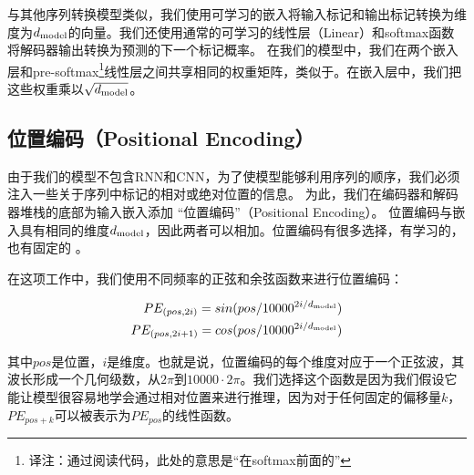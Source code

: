 与其他序列转换模型类似，我们使用可学习的嵌入将输入标记和输出标记转换为维度为$d_{\text{model}}$的向量。我们还使用通常的可学习的线性层（Linear）和softmax函数将解码器输出转换为预测的下一个标记概率。 在我们的模型中，我们在两个嵌入层和pre-softmax\footnote{译注：通过阅读代码，此处的意思是“在softmax前面的”}线性层之间共享相同的权重矩阵，类似于\citep{press2016using}。在嵌入层中，我们把这些权重乘以$\sqrt{d_{\text{model}}}$。

\subsection{位置编码（Positional Encoding）}
由于我们的模型不包含RNN和CNN，为了使模型能够利用序列的顺序，我们必须注入一些关于序列中标记的相对或绝对位置的信息。 为此，我们在编码器和解码器堆栈的底部为输入嵌入添加 “位置编码”（Positional Encoding）。 位置编码与嵌入具有相同的维度$d_{\text{model}}$，因此两者可以相加。位置编码有很多选择，有学习的，也有固定的 \citep{JonasFaceNet2017}。


在这项工作中，我们使用不同频率的正弦和余弦函数来进行位置编码：

\begin{align*}
    PE_{(pos,2i)} = sin(pos / 10000^{2i/d_{\text{model}}}) \\
    PE_{(pos,2i+1)} = cos(pos / 10000^{2i/d_{\text{model}}})
\end{align*}


其中$pos$是位置，$i$是维度。也就是说，位置编码的每个维度对应于一个正弦波，其波长形成一个几何级数，从$2\pi$到$10000\cdot 2\pi$。我们选择这个函数是因为我们假设它能让模型很容易地学会通过相对位置来进行推理，因为对于任何固定的偏移量$k$，$PE_{pos+k}$可以被表示为$PE_{pos}$的线性函数。

